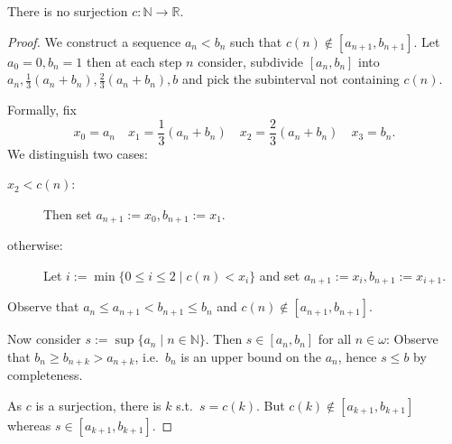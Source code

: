 \documentclass{whrartcl}
\newcommand{\NN}{\mathbb{N}}
\newcommand{\ZZ}{\mathbb{Z}}
\newcommand{\QQ}{\mathbb{Q}}
\newcommand{\RR}{\mathbb{R}}
\newcommand{\cls}[1]{\llbracket #1 \rrbracket}
\begin{document}
\begin{proposition}
  There is no surjection $c : \NN \to \RR$.
\end{proposition}
\begin{proof}
  We construct a sequence $a_n < b_n$ such that $c(n) \not\in [a_{n + 1}, b_{n +
  1}]$. Let
  $a_0 = 0, b_n = 1$ then at each step $n$ consider, subdivide $[a_n, b_n]$ into
  $a_n, \frac 1 3 (a_n + b_n), \frac 2 3 (a_n + b_n), b$ and pick the subinterval not
  containing $c(n)$.

  Formally, fix
  \[
    x_0 = a_n \quad x_1 = \frac 1 3 (a_n + b_n) \quad x_2 = \frac 2 3 (a_n +
    b_n) \quad x_3 = b_n.
  \]
  We distinguish two cases:
  \begin{description}
  \item[$x_2 < c(n)$:] Then set $a_{n + 1} := x_0, b_{n + 1} := x_1$.
  \item[otherwise:] Let $i := \min \{0 \leq i \leq 2 \mid c(n) < x_i\}$ and set
    $a_{n + 1} := x_i, b_{n + 1} := x_{i + 1}$.
  \end{description}
  Observe that $a_n \leq a_{n + 1} < b_{n + 1} \leq b_n$ and $c(n) \not\in [a_{n
  + 1}, b_{n + 1}]$.

  Now consider $s := \sup \{a_n \mid n \in \NN\}$. Then $s \in [a_n, b_n]$ for
  all $n \in \omega$: Observe that $b_n \geq b_{n + k} > a_{n + k}$, i.e.\ $b_n$
  is an upper bound on the $a_n$, hence $s \leq b$ by completeness.

  As $c$ is a surjection, there is $k$ s.t.\ $s = c(k)$. But $c(k) \not\in [a_{k
  + 1},
  b_{k + 1}]$ whereas $s \in [a_{k + 1}, b_{k + 1}]$.
\end{proof}



\end{document}
